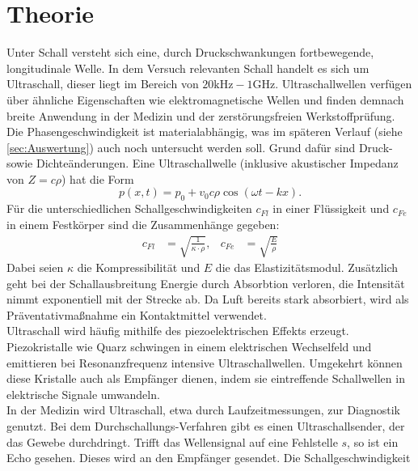 \section{Theorie}
\label{sec:Theorie}

Unter Schall versteht sich eine, durch Druckschwankungen fortbewegende, 
longitudinale Welle.
In dem Versuch relevanten Schall handelt es sich um Ultraschall, dieser liegt
im Bereich von $20 \unit{\kilo\hertz} - 1 \unit{\giga\hertz}$.
Ultraschallwellen verfügen über ähnliche Eigenschaften wie elektromagnetische
Wellen und finden demnach breite Anwendung in der Medizin und der
zerstörungsfreien Werkstoffprüfung. Die Phasengeschwindigkeit ist materialabhängig,
was im späteren Verlauf (siehe \autoref{sec:Auswertung}) auch noch untersucht
werden soll. Grund dafür sind Druck- sowie Dichteänderungen.
Eine Ultraschallwelle (inklusive akustischer Impedanz von $Z=c \rho$) hat die 
Form
\begin{equation}
    \label{eqn:1}
    p(x,t) = p_0 + v_0 c \rho \cos(\omega t - kx).
\end{equation}
Für die unterschiedlichen Schallgeschwindigkeiten $c_{Fl}$ in einer Flüssigkeit 
und $c_{Fe}$ in einem Festkörper sind die Zusammenhänge gegeben:
\begin{align}
    \label{eqn:2}
    c_{Fl} &= \sqrt{\frac{1}{\kappa \cdot \rho}}, & c_{Fe} &= \sqrt{\frac{E}{\rho}}
\end{align}
\noindent Dabei seien $\kappa$ die Kompressibilität und $E$ die das 
Elastizitätsmodul. Zusätzlich geht bei der Schallausbreitung Energie durch 
Absorbtion verloren, die Intensität nimmt exponentiell mit der Strecke ab.
Da Luft bereits stark absorbiert, wird als Präventativmaßnahme ein 
Kontaktmittel verwendet.
\vspace{0.5em}
\\
\noindent Ultraschall wird häufig mithilfe des piezoelektrischen Effekts erzeugt.
Piezokristalle wie Quarz schwingen in einem elektrischen Wechselfeld und
emittieren bei Resonanzfrequenz intensive Ultraschallwellen. Umgekehrt können
diese Kristalle auch als Empfänger dienen, indem sie eintreffende Schallwellen
in elektrische Signale umwandeln.
\vspace{0.5em}
\\
\noindent In der Medizin wird Ultraschall, etwa durch Laufzeitmessungen, zur Diagnostik
genutzt. Bei dem Durchschallungs-Verfahren gibt es einen Ultraschallsender,
der das Gewebe durchdringt. Trifft das Wellensignal auf eine Fehlstelle $s$, so 
ist ein Echo gesehen. Dieses wird an den Empfänger gesendet. Die Schallgeschwindigkeit 
